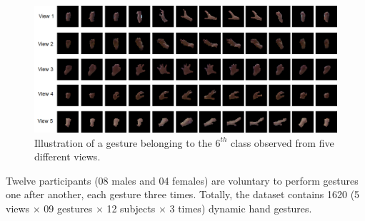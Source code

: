     \begin{figure}[htbp]
        \centering
        \includegraphics[width=0.9\linewidth]{figs/MICAGes2.png}
        \caption{Illustration of a gesture belonging to the $6^{th}$ class observed from five different views.}
        \label{Fig:MICAGes2}
    \end{figure}
    Twelve participants (08 males and 04 females) are voluntary to perform gestures one after another, each gesture three times. Totally, the dataset contains 1620 (5 views $\times$ 09 gestures $\times$ 12 subjects $\times$ 3 times) dynamic hand gestures.
